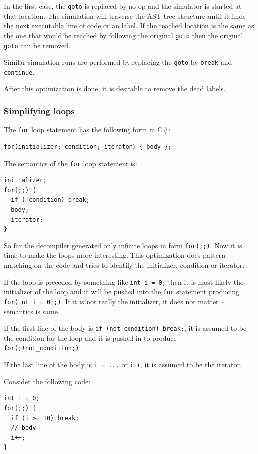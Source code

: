 \documentclass[12pt,twoside,notitlepage]{report}
\begin{document}
In the first case, the \verb|goto| is replaced by
no-op and the simulator is started at that location.
The simulation will traverse the AST tree structure until
it finds the next executable line of code or an label.
If the reached location is the same as the one that would be reached
by following the original \verb|goto| then the original \verb|goto|
can be removed.

Similar simulation runs are performed by replacing the
\verb|goto| by \verb|break| and \verb|continue|.



After this optimization is done, it is desirable to remove the dead labels.

\subsubsection{Simplifying loops}
        \label{Simplifying loops}

The \verb|for| loop statement has the following form in C\#:
\begin{verbatim}
for(initializer; condition; iterator) { body };
\end{verbatim}

The semantics of the \verb|for| loop statement is:
\begin{verbatim}
initializer;
for(;;) {
  if (!condition) break;
  body;
  iterator;
}
\end{verbatim}

So far the decompiler generated only infinite loops in form
\verb|for(;;)|.  Now it is time to make the loops more interesting.
This optimization does pattern matching on the code and tries
to identify the initializer, condition or iterator.

If the loop is preceded by something like \verb|int i = 0;| then it is most
likely the initializer of the loop and it will be pushed into
the \verb|for| statement producing \verb|for(int i = 0;;)|.
If it is not really the initializer, it does not matter -- 
semantics is same.

If the first line of the body is \verb|if (not_condition) break;|,
it is assumed to be the condition for the loop and it is pushed
in to produce \verb|for(;!not_condition;)|.

If the last line of the body is \verb|i = ...| or \verb|i++|,
it is assumed to be the iterator.

Consider the following code:
\begin{verbatim}
int i = 0;
for(;;) {
  if (i >= 10) break;
  // body
  i++;
}
\end{verbatim}
\end{document}
